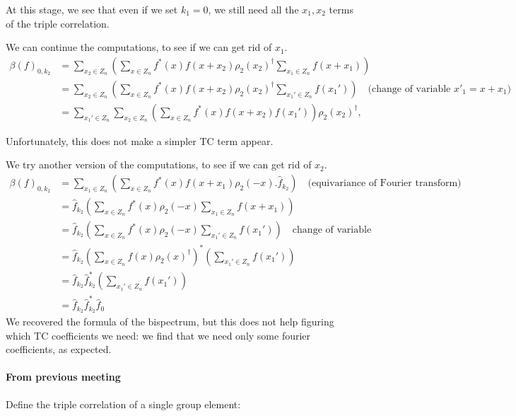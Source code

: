 At this stage, we see that even if we set $k_1=0$, we still need all the $x_1, x_2$ terms of the triple correlation.

We can continue the computations, to see if we can get rid of $x_1$.
\begin{align*}
    \beta(f)_{0, k_2}
    &=
   \sum_{x_2 \in Z_n} \left(\sum_{x \in Z_n} f^*(x) f\left(x+ x_2\right) \rho_2(x_2)^{\dagger}
      \sum_{x_1 \in Z_n}  f\left(x + x_1\right) \right)\\
          &=
    \sum_{x_2 \in Z_n} \left(\sum_{x \in Z_n}  f^*(x) f\left(x+ x_2\right) \rho_2(x_2)^{\dagger}
      \sum_{x_1' \in Z_n}  f\left(x_1'\right) \right) \quad \text{(change of variable $x'_1 = x + x_1$)}\\
          &=
    \sum_{x_1' \in Z_n}\sum_{x_2 \in Z_n}\left(\sum_{x \in Z_n}  f^*(x) f\left(x+ x_2\right) f\left(x_1'\right)\right) \rho_2(x_2)^{\dagger},
\end{align*}

Unfortunately, this does not make a simpler TC term appear.

We try another version of the computations, to see if we can get rid of $x_2$.
\begin{align*}
    \beta(f)_{0, k_2}
    &=
    \sum_{x_1 \in Z_n}
    \left(\sum_{x \in Z_n}
       f^*(x)
       f\left(x + x_1\right) \rho_2(-x).\hat{f}_{k_2}\right) \quad \text{(equivariance of Fourier transform)}\\
    &=
   \hat{f}_{k_2}
    \left(\sum_{x \in Z_n}
       f^*(x)  \rho_2(-x)\sum_{x_1 \in Z_n}
       f\left(x + x_1\right) \right) \\
    &=
    \hat{f}_{k_2}
    \left(\sum_{x \in Z_n}
       f^*(x)  \rho_2(-x)\sum_{x_1' \in Z_n}
       f\left(x_1'\right) \right) \quad \text{change of variable}\\
    &=
    \hat{f}_{k_2}
    \left(\sum_{x \in Z_n}
       f(x)  \rho_2(x)^\dagger\right)^*\left(\sum_{x_1' \in Z_n}
       f\left(x_1'\right) \right)\\
    &=
    \hat{f}_{k_2}
    \hat{f}_{k_2}^*\left(\sum_{x_1' \in Z_n}
       f\left(x_1'\right) \right)\\
    &=
    \hat{f}_{k_2}
    \hat{f}_{k_2}^*\hat{f}_{0}
\end{align*}
We recovered the formula of the bispectrum, but this does not help figuring which TC coefficients we need: we find that we need only some fourier coefficients, as expected.

\paragraph{From previous meeting} Define the triple correlation of a single group element:

